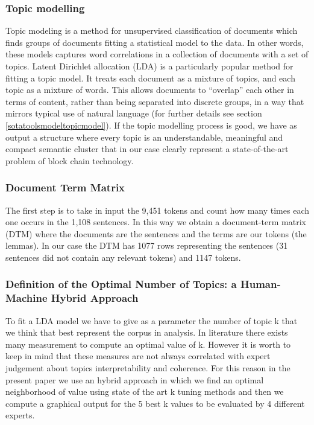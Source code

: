 \documentclass[]{book}
\begin{document}
\subsubsection*{Topic modelling}\label{topic-modelling}

Topic modeling is a method for unsupervised classification of documents
which finds groups of documents fitting a statistical model to the data.
In other words, these models captures word correlations in a collection
of documents with a set of topics. Latent Dirichlet allocation (LDA) is
a particularly popular method for fitting a topic model. It treats each
document as a mixture of topics, and each topic as a mixture of words.
This allows documents to ``overlap'' each other in terms of content,
rather than being separated into discrete groups, in a way that mirrors
typical use of natural language (for further details see section
\ref{sotatoolsmodeltopicmodel}). If the topic modelling process is good,
we have as output a structure where every topic is an understandable,
meaningful and compact semantic cluster that in our case clearly
represent a state-of-the-art problem of block chain technology.

\subsubsection*{Document Term Matrix}\label{document-term-matrix}

The first step is to take in input the 9,451 tokens and count how many
times each one occurs in the 1,108 sentences. In this way we obtain a
document-term matrix (DTM) where the documents are the sentences and the
terms are our tokens (the lemmas). In our case the DTM has 1077 rows
representing the sentences (31 sentences did not contain any relevant
tokens) and 1147 tokens.

\subsubsection*{Definition of the Optimal Number of Topics: a
Human-Machine Hybrid
Approach}\label{definition-of-the-optimal-number-of-topics-a-human-machine-hybrid-approach}

To fit a LDA model we have to give as a parameter the number of topic k
that we think that best represent the corpus in analysis. In literature
there exists many measurement to compute an optimal value of k. However
it is worth to keep in mind that these measures are not always
correlated with expert judgement about topics interpretability and
coherence. For this reason in the present paper we use an hybrid
approach in which we find an optimal neighborhood of value using state
of the art k tuning methods and then we compute a graphical output for
the 5 best k values to be evaluated by 4 different experts.
\end{document}
